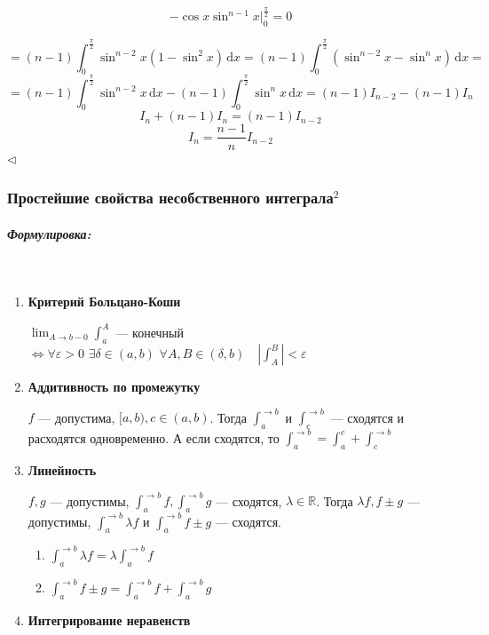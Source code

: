 \documentclass{article}
\def\dbl{\,\,}
\def\D{\,\mathrm{d}}
\let\vanillasubparagraph\subparagraph
\renewcommand{\subparagraph}[1]{\vanillasubparagraph{#1}\mbox{}\\}
\begin{document}
$$
-\cos x \sin^{n-1} x |_0^{\frac{\pi}{2}} = 0
$$

$$
= (n-1)\int_0^\frac{\pi}{2} \sin^{n-2}x (1 - \sin^2x) \D x = (n-1)\int_0^\frac{\pi}{2} (\sin^{n-2}x - \sin^n x) \D x = 
$$
$$
= (n-1)\int_0^\frac{\pi}{2} \sin^{n-2}x \D x - (n-1)\int_0^\frac{\pi}{2} \sin^n x \D x = (n-1) I_{n-2} - (n-1) I_n 
$$
$$
I_n + (n-1)I_n = (n-1)I_{n-2}
$$
$$
I_n = \frac{n-1}{n}I_{n-2}
$$
$\lhd$

\subsubsection{Простейшие свойства несобственного интеграла\texorpdfstring{$^2$}{}}

\subparagraph{Формулировка:}

\begin{enumerate}
    \item \textbf{Критерий Больцано-Коши}
    
    $\lim_{A \rightarrow b - 0}{\int_a^A}$ --- конечный $\Leftrightarrow \forall \varepsilon > 0 \dbl \exists \delta \in (a, b) \dbl \forall A, B \in (\delta, b) \quad \left|\int_A^B\right| < \varepsilon$
    
  \item \textbf{Аддитивность по промежутку}
    
    $f$ --- допустима, $[a, b), c \in (a, b)$. Тогда $\int_a^{\rightarrow b}$ и $\int_c^{\rightarrow b}$ --- сходятся и расходятся одновременно. А если сходятся, то $\int_a^{\rightarrow b} = \int_a^{c} + \int_c^{\rightarrow b}$
    
  \item \textbf{Линейность}
    
    $f, g$ --- допустимы, $\int_a^{\rightarrow b}f, \int_a^{\rightarrow b}g$ --- сходятся, $\lambda \in \mathbb{R}$. Тогда $\lambda f, f \pm g$ --- допустимы, $\int_a^{\rightarrow b}{\lambda f}$ и $\int_a^{\rightarrow b}{f \pm g}$ --- сходятся. 
    
    \begin{enumerate}
        \item $\int_a^{\rightarrow b}{\lambda f} = \lambda \int_a^{\rightarrow b}{f}$
        
         \item $\int_a^{\rightarrow b}{f \pm g} = \int_a^{\rightarrow b}{f} + \int_a^{\rightarrow b}{g}$
    \end{enumerate}
    \item \textbf{Интегрирование неравенств}
    

\end{enumerate}
\end{document}
